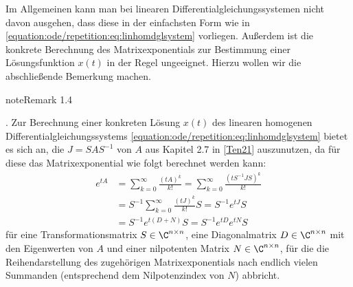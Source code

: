 \documentclass[letterpaper,10pt,german]{jupyterBook}
\begin{document}
\sphinxAtStartPar
Im Allgemeinen kann man bei linearen Differentialgleichungssystemen nicht davon ausgehen, dass diese in der einfachsten Form wie in \eqref{equation:ode/repetition:eq:linhomdglsystem} vorliegen.
Außerdem ist die konkrete Berechnung des Matrixexponentials zur Bestimmung einer Lösungsfunktion \(x(t)\) in der Regel ungeeignet.
Hierzu wollen wir die abschließende Bemerkung machen.
\label{ode/repetition:remark-16}
\begin{sphinxadmonition}{note}{Remark 1.4}



. Zur Berechnung einer konkreten Lösung \(x(t)\) des linearen homogenen Differentialgleichungssystems \eqref{equation:ode/repetition:eq:linhomdglsystem} bietet es sich an, die  \(J = SAS^{-1}\) von \(A\) aus Kapitel 2.7 in {[}\hyperlink{cite.references:id15}{Ten21}{]} auszunutzen, da für diese das Matrixexponential wie folgt berechnet werden kann:
\begin{equation*}
\begin{split}e^{tA} &=  \sum_{k=0}^\infty \frac{(t A)^k}{k!} = \sum_{k=0}^\infty \frac{(tS^{-1}JS)^k}{k!} 
\\&= 
S^{-1} \sum_{k=0}^\infty \frac{(tJ)^k}{k!} S = S^{-1} e^{tJ}S 
\\&= S^{-1} e^{t(D+N)}S = S^{-1} e^{tD} e^{tN} S\end{split}
\end{equation*}
\sphinxAtStartPar
für eine Transformationsmatrix \(S \in \C^{n \times n}\), eine Diagonalmatrix \(D \in \C^{n \times n}\) mit den Eigenwerten von \(A\) und einer nilpotenten Matrix \(N \in \C^{n \times n}\), für die die Reihendarstellung des zugehörigen Matrixexponentials nach endlich vielen Summanden (entsprechend dem Nilpotenzindex von \(N\)) abbricht.


\end{sphinxadmonition}
\end{document}
